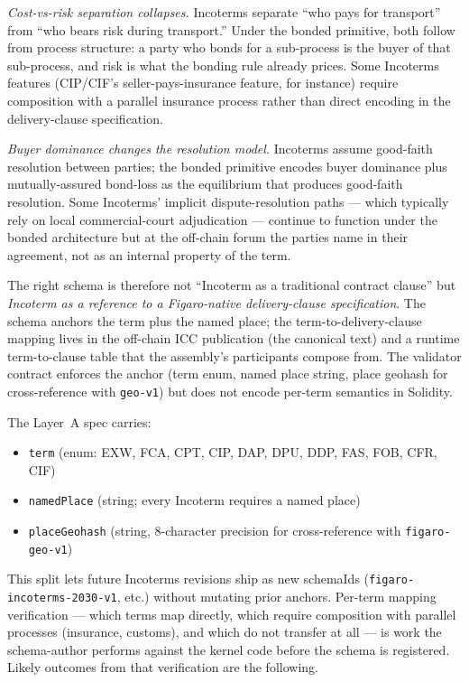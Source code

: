 \documentclass[11pt,a4paper]{article}
\theoremstyle{definition}
\theoremstyle{remark}
\begin{document}
\emph{Cost-vs-risk separation collapses.} Incoterms separate
``who pays for transport'' from ``who bears risk during
transport.'' Under the bonded primitive, both follow from process
structure: a party who bonds for a sub-process is the buyer of
that sub-process, and risk is what the bonding rule already
prices. Some Incoterms features (CIP/CIF's seller-pays-insurance
feature, for instance) require composition with a parallel
insurance process rather than direct encoding in the
delivery-clause specification.

\emph{Buyer dominance changes the resolution model.} Incoterms
assume good-faith resolution between parties; the bonded
primitive encodes buyer dominance plus mutually-assured
bond-loss as the equilibrium that produces good-faith resolution.
Some Incoterms' implicit dispute-resolution paths --- which
typically rely on local commercial-court adjudication --- continue
to function under the bonded architecture but at the off-chain
forum the parties name in their agreement, not as an internal
property of the term.

The right schema is therefore not ``Incoterm as a traditional
contract clause'' but \emph{Incoterm as a reference to a
Figaro-native delivery-clause specification}. The schema anchors
the term plus the named place; the term-to-delivery-clause
mapping lives in the off-chain ICC publication (the canonical
text) and a runtime term-to-clause table that the assembly's
participants compose from. The validator contract enforces the
anchor (term enum, named place string, place geohash for
cross-reference with \texttt{geo-v1}) but does not encode
per-term semantics in Solidity.

The Layer~A spec carries:

\begin{itemize}
  \item \texttt{term} (enum: EXW, FCA, CPT, CIP, DAP, DPU, DDP,
    FAS, FOB, CFR, CIF)
  \item \texttt{namedPlace} (string; every Incoterm requires a
    named place)
  \item \texttt{placeGeohash} (string, 8-character precision
    for cross-reference with \texttt{figaro-geo-v1})
\end{itemize}

This split lets future Incoterms revisions ship as new schemaIds
(\texttt{figaro-incoterms-2030-v1}, etc.) without mutating prior
anchors. Per-term mapping verification --- which terms map
directly, which require composition with parallel processes
(insurance, customs), and which do not transfer at all --- is
work the schema-author performs against the kernel code before
the schema is registered. Likely outcomes from that verification
are the following.
\end{document}
